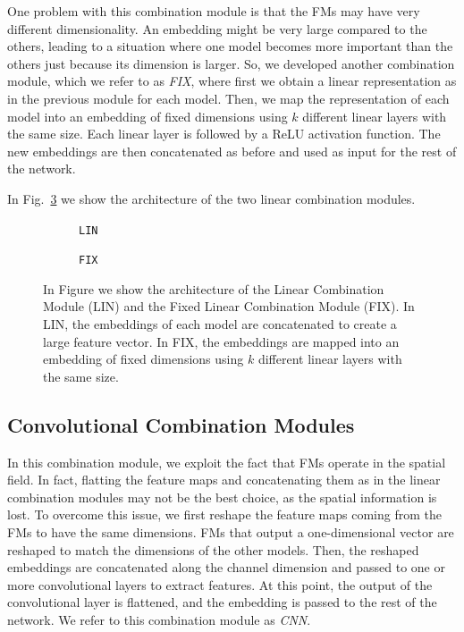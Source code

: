 One problem with this combination module is that the FMs may have very different dimensionality.
An embedding might be very large compared to the others, leading to a situation where one model becomes more important than the others just because its dimension is larger.
So, we developed another combination module, which we refer to as \textit{FIX}, where first we obtain a linear representation as in the previous module for each model.
Then, we map the representation of each model into an embedding of fixed dimensions using $k$ different linear layers with the same size.
Each linear layer is followed by a ReLU activation function.
The new embeddings are then concatenated as before and used as input for the rest of the network.

In Fig.~\ref{fig:lin_combination} we show the architecture of the two linear combination modules.


\begin{figure}[ht]
    \centering
    \begin{subfigure}[b]{0.47\textwidth}
        \centering
        \fbox{\rule[-.5cm]{0cm}{4cm} \rule[-.5cm]{4cm}{0cm}}
        \caption{\texttt{LIN}}
        \label{fig:lin}
    \end{subfigure}
    \hfill
    \begin{subfigure}[b]{0.47\textwidth}
        \centering
        \fbox{\rule[-.5cm]{0cm}{4cm} \rule[-.5cm]{4cm}{0cm}}
        \caption{\texttt{FIX}}
        \label{fig:fix_lin}
    \end{subfigure}

    \caption{In Figure we show the architecture of the Linear Combination Module (LIN) and the Fixed Linear Combination Module (FIX). In LIN, the embeddings of each model are concatenated to create a large feature vector. In FIX, the embeddings are mapped into an embedding of fixed dimensions using $k$ different linear layers with the same size.}
    \label{fig:lin_combination}
\end{figure}




\subsection{Convolutional Combination Modules}
\label{subsec:convolutional_combination}
In this combination module, we exploit the fact that FMs operate in the spatial field.
In fact, flatting the feature maps and concatenating them as in the linear combination modules may not be the best choice, as the spatial information is lost.
To overcome this issue, we first reshape the feature maps coming from the FMs to have the same dimensions.
FMs that output a one-dimensional vector are reshaped to match the dimensions of the other models.
Then, the reshaped embeddings are concatenated along the channel dimension and passed to one or more convolutional layers to extract features.
At this point, the output of the convolutional layer is flattened, and the embedding is passed to the rest of the network.
We refer to this combination module as \textit{CNN}.



